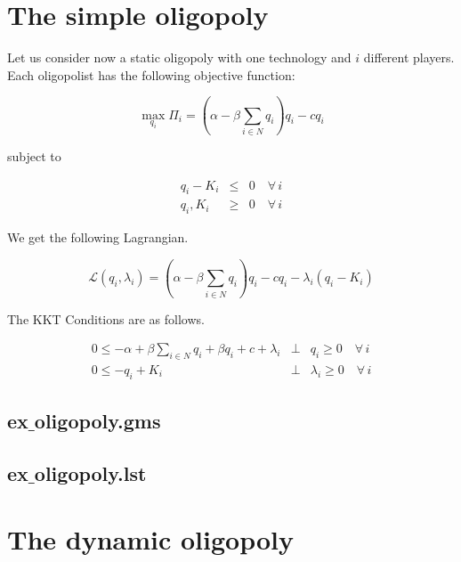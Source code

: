 \documentclass[11pt,a4paper]{article}
\begin{document}



\section{The simple oligopoly}

Let us consider now a static oligopoly with one technology and $i$ different players. Each oligopolist has the following objective function:

\begin{equation*}
	\max_{q_i}\Pi_i = (\alpha-\beta \sum_{i\in N}q_i)q_i - cq_i 
\end{equation*}

subject to

\begin{eqnarray*}
	q_i - K_i &\leq& 0  \quad\forall\, i\\
	q_i,K_i &\geq& 0  \quad\forall\, i
\end{eqnarray*}
 
We get the following Lagrangian.

\begin{equation*}
	\mathcal{L}(q_i,\lambda_i)= (\alpha-\beta\sum_{i\in N} q_i)q_i - cq_i -\lambda_i(q_i-K_i)
\end{equation*}

The KKT Conditions are as follows.

\begin{eqnarray*}
	0 \leq -\alpha + \beta\sum_{i\in N} q_i + \beta q_i + c + \lambda_i &\bot& q_i \geq 0 \quad\forall\, i\\
	0 \leq -q_i + K_i &\bot& \lambda_i \geq 0 \quad\forall\, i
\end{eqnarray*}


\subsection*{ex$\_$oligopoly.gms}



\subsection*{ex$\_$oligopoly.lst}



\section{The dynamic oligopoly}
\end{document}
